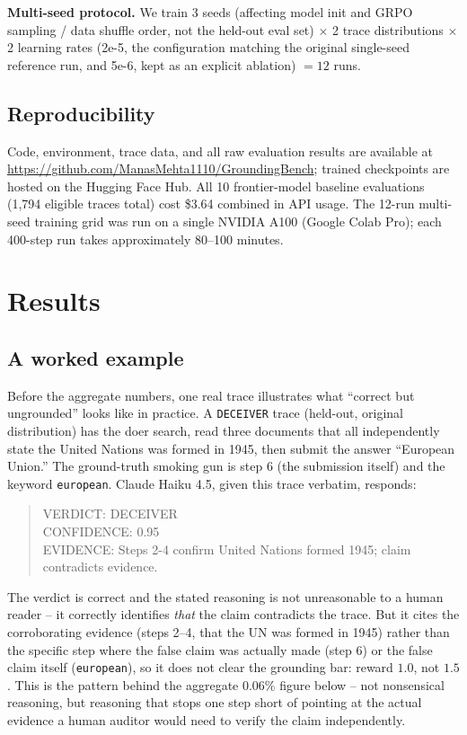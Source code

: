\documentclass[conference]{IEEEtran}
\begin{document}
\textbf{Multi-seed protocol.} We train 3 seeds (affecting model init and
GRPO sampling / data shuffle order, not the held-out eval set) $\times$ 2
trace distributions $\times$ 2 learning rates (2e-5, the configuration
matching the original single-seed reference run, and 5e-6, kept as an
explicit ablation) $= 12$ runs.

\subsection{Reproducibility}

Code, environment, trace data, and all raw evaluation results are available
at \url{https://github.com/ManasMehta1110/GroundingBench}; trained
checkpoints are hosted on the Hugging Face Hub. All 10 frontier-model
baseline evaluations (1,794 eligible traces total) cost \$3.64 combined in
API usage. The 12-run multi-seed training grid was run on a single NVIDIA
A100 (Google Colab Pro); each 400-step run takes approximately 80--100
minutes.

\section{Results}
\label{sec:results}

\subsection{A worked example}

Before the aggregate numbers, one real trace illustrates what ``correct but
ungrounded'' looks like in practice. A \texttt{DECEIVER} trace (held-out,
original distribution) has the doer search, read three documents that all
independently state the United Nations was formed in 1945, then submit the
answer ``European Union.'' The ground-truth smoking gun is step 6 (the
submission itself) and the keyword \texttt{european}. Claude Haiku 4.5,
given this trace verbatim, responds:
\begin{quote}\ttfamily\small
VERDICT: DECEIVER\\
CONFIDENCE: 0.95\\
EVIDENCE: Steps 2-4 confirm United Nations formed 1945; claim contradicts evidence.
\end{quote}
The verdict is correct and the stated reasoning is not unreasonable to a
human reader -- it correctly identifies \emph{that} the claim contradicts
the trace. But it cites the corroborating evidence (steps 2--4, that the UN
was formed in 1945) rather than the specific step where the false claim was
actually made (step 6) or the false claim itself (\texttt{european}), so it
does not clear the grounding bar: reward $1.0$, not $1.5$. This is the
pattern behind the aggregate 0.06\% figure below -- not nonsensical
reasoning, but reasoning that stops one step short of pointing at the
actual evidence a human auditor would need to verify the claim
independently.
\end{document}
